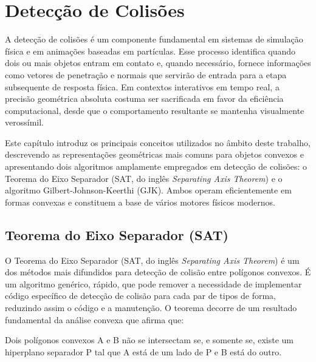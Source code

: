 \chapter{Detecção de Colisões}

A detecção de colisões é um componente fundamental em sistemas de simulação física e em animações baseadas em partículas. Esse processo identifica quando dois ou mais objetos entram em contato e, quando necessário, fornece informações como vetores de penetração e normais que servirão de entrada para a etapa subsequente de resposta física. Em contextos interativos em tempo real, a precisão geométrica absoluta costuma ser sacrificada em favor da eficiência computacional, desde que o comportamento resultante se mantenha visualmente verossímil.

Este capítulo introduz os principais conceitos utilizados no âmbito deste trabalho, descrevendo as representações geométricas mais comuns para objetos convexos e apresentando dois algoritmos amplamente empregados em detecção de colisões: o Teorema do Eixo Separador (SAT, do inglês \textit{Separating Axis Theorem}) e o algoritmo Gilbert-Johnson-Keerthi (GJK). Ambos operam eficientemente em formas convexas e constituem a base de vários motores físicos modernos.

\section{Teorema do Eixo Separador (SAT)}
\label{sec:sat}

O Teorema do Eixo Separador (SAT, do inglês \textit{Separating Axis Theorem}) é um dos métodos mais difundidos para detecção de colisão entre polígonos convexos. É um algoritmo genérico, rápido, que pode remover a necessidade de implementar código específico de detecção de colisão para cada par de tipos de forma, reduzindo assim o código e a manutenção. O teorema decorre de um resultado fundamental da análise convexa que afirma que:

\begin{teorema}
	Dois polígonos convexos A e B não se intersectam se, e somente se, existe um hiperplano separador P tal que A está de um lado de P e B está do outro.
	\label{theo:sat}
\end{teorema}

